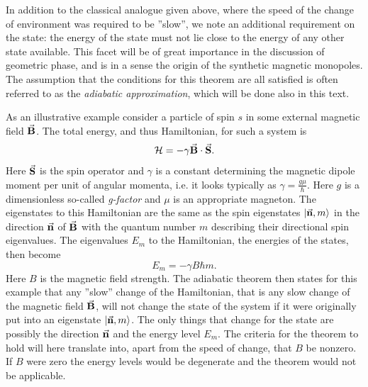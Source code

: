 \documentclass[main.tex]{subfiles}
\begin{document}
In addition to the classical analogue given above, where the speed of the change of
environment was required to be ''slow'', we note an additional requirement on the state: the
energy of the state must not lie close to the energy of any other state available. This
facet will be of great importance in the discussion of geometric phase, and is in a sense the
origin of the synthetic magnetic monopoles. The assumption that the conditions for this
theorem are all satisfied is often referred to as the \textit{adiabatic approximation},
which will be done also in this text.

As an illustrative example consider a particle of spin \(s\) in some external magnetic
field \(\va{B}\). The total energy, and thus Hamiltonian, for such a system is \[
\mathbb{\cal H} = -\gamma \va{B}\cdot \va{S}
.\] 
Here \(\va{S}\) is the spin operator and \(\gamma\) is a constant determining the magnetic
dipole moment per unit of angular momenta, i.e. it looks typically as \(\gamma =
\frac{g\mu}{\hbar{}}\). Here \(g\) is a dimensionless so-called \textit{g-factor} and
\(\mu\) is an appropriate magneton. The eigenstates to this Hamiltonian are the same as the
spin eigenstates \(\ket{\va{n}, m}\) in the direction \(\va{n}\) of \(\va{B}\) with the
quantum number \(m\) describing their directional spin eigenvalues. The eigenvalues \(E_m\) to the
Hamiltonian, the energies of the states, then become \[
E_m = -\gamma B \hbar{} m
.\] 
Here \(B\) is the magnetic field strength. The adiabatic theorem then states for this
example that any ''slow'' change of the Hamiltonian, that is any slow change of the
magnetic field \(\va{B}\), will not change the state of the system if it were originally
put into an eigenstate \(\ket{\va{n}, m}\). The only things that change for the state are
possibly the direction \(\va{n}\) and the energy level \(E_m\). The criteria for the
theorem to hold will here translate into, apart from the speed of change, that \(B\) be
nonzero. If \(B\) were zero the energy levels would be degenerate and the theorem would not be applicable.
\end{document}

